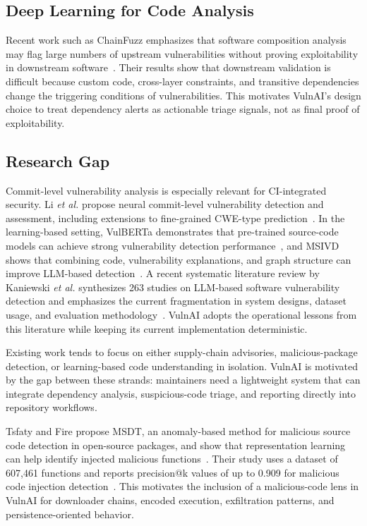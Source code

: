 \documentclass[conference]{IEEEtran}
\begin{document}
\subsection{Deep Learning for Code Analysis}
Recent work such as ChainFuzz emphasizes that software composition analysis may flag large numbers of upstream vulnerabilities without proving exploitability in downstream software~\cite{deng2025chainfuzz}. Their results show that downstream validation is difficult because custom code, cross-layer constraints, and transitive dependencies change the triggering conditions of vulnerabilities. This motivates VulnAI's design choice to treat dependency alerts as actionable triage signals, not as final proof of exploitability.

\subsection{Research Gap}
Commit-level vulnerability analysis is especially relevant for CI-integrated security. Li \emph{et al.} propose neural commit-level vulnerability detection and assessment, including extensions to fine-grained CWE-type prediction~\cite{li2023commit}. In the learning-based setting, VulBERTa demonstrates that pre-trained source-code models can achieve strong vulnerability detection performance~\cite{hanif2022vulberta}, and MSIVD shows that combining code, vulnerability explanations, and graph structure can improve LLM-based detection~\cite{yang2024msivd}. A recent systematic literature review by Kaniewski \emph{et al.} synthesizes 263 studies on LLM-based software vulnerability detection and emphasizes the current fragmentation in system designs, dataset usage, and evaluation methodology~\cite{kaniewski2025slr}. VulnAI adopts the operational lessons from this literature while keeping its current implementation deterministic.

\noindent Existing work tends to focus on either supply-chain advisories, malicious-package detection, or learning-based code understanding in isolation. VulnAI is motivated by the gap between these strands: maintainers need a lightweight system that can integrate dependency analysis, suspicious-code triage, and reporting directly into repository workflows.

Tsfaty and Fire propose MSDT, an anomaly-based method for malicious source code detection in open-source packages, and show that representation learning can help identify injected malicious functions~\cite{tsfaty2023malicious}. Their study uses a dataset of 607{,}461 functions and reports precision@k values of up to 0.909 for malicious code injection detection~\cite{tsfaty2023malicious}. This motivates the inclusion of a malicious-code lens in VulnAI for downloader chains, encoded execution, exfiltration patterns, and persistence-oriented behavior.
\end{document}
